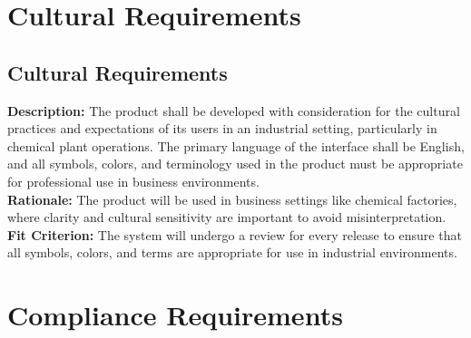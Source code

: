 \documentclass[12pt]{article}
\begin{document}
\section{Cultural Requirements}
\subsection{Cultural Requirements}
\begin{tcolorbox}[title=CR1]
  \textbf{Description:} The product shall be developed with consideration for the cultural practices and expectations of its users in an industrial setting, particularly in chemical plant operations. The primary language of the interface shall be English, and all symbols, colors, and terminology used in the product must be appropriate for professional use in business environments. \\
  \textbf{Rationale:} The product will be used in business settings like chemical factories, where clarity and cultural sensitivity are important to avoid misinterpretation. \\
  \textbf{Fit Criterion:} The system will undergo a review for every release to ensure that all symbols, colors, and terms are appropriate for use in industrial environments.
\end{tcolorbox}

\section{Compliance Requirements}
\end{document}
